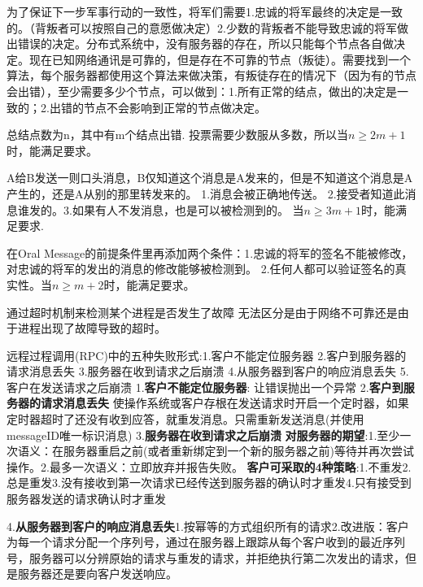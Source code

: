 \documentclass[twoside]{ctexart}
\begin{document}
\begin{multicols}{2}
   为了保证下一步军事行动的一致性，将军们需要1.忠诚的将军最终的决定是一致的。（背叛者可以按照自己的意愿做决定）2.少数的背叛者不能导致忠诚的将军做出错误的决定。分布式系统中，没有服务器的存在，所以只能每个节点各自做决定。现在已知网络通讯是可靠的，但是存在不可靠的节点（叛徒）。需要找到一个算法，每个服务器都使用这个算法来做决策，有叛徒存在的情况下（因为有的节点会出错），至少需要多少个节点，可以做到：1.所有正常的结点，做出的决定是一致的；2.出错的节点不会影响到正常的节点做决定。
  
   总结点数为n，其中有m个结点出错. 投票需要少数服从多数，所以当$n≥2m+1$时，能满足要求。
  
   A给B发送一则口头消息，B仅知道这个消息是A发来的，但是不知道这个消息是A产生的，还是A从别的那里转发来的。  1.消息会被正确地传送。 2.接受者知道此消息谁发的。3.如果有人不发消息，也是可以被检测到的。 当$n≥3m+1$时，能满足要求. 
  
   在Oral Message的前提条件里再添加两个条件：1.忠诚的将军的签名不能被修改，对忠诚的将军的发出的消息的修改能够被检测到。 2.任何人都可以验证签名的真实性。当$n≥m+2$时，能满足要求。
  
    通过超时机制来检测某个进程是否发生了故障  无法区分是由于网络不可靠还是由于进程出现了故障导致的超时。

   远程过程调用(RPC)中的五种失败形式:1.客户不能定位服务器 2.客户到服务器的请求消息丢失 3.服务器在收到请求之后崩溃 4.从服务器到客户的响应消息丢失 5.客户在发送请求之后崩溃    1.\textbf{客户不能定位服务器}: 让错误抛出一个异常 2.\textbf{客户到服务器的请求消息丢失} 使操作系统或客户存根在发送请求时开启一个定时器，如果定时器超时了还没有收到应答，就重发消息。只需重新发送消息(并使用messageID唯一标识消息)  3.\textbf{服务器在收到请求之后崩溃} \textbf{对服务器的期望}:1.至少一次语义：在服务器重启之前(或者重新绑定到一个新的服务器之前)等待并再次尝试操作。2.最多一次语义：立即放弃并报告失败。 \textbf{客户可采取的4种策略}:1.不重发2.总是重发3.没有接收到第一次请求已经传送到服务器的确认时才重发4.只有接受到服务器发送的请求确认时才重发  
  
  4.\textbf{从服务器到客户的响应消息丢失}1.按幂等的方式组织所有的请求2.改进版：客户为每一个请求分配一个序列号，通过在服务器上跟踪从每个客户收到的最近序列号，服务器可以分辨原始的请求与重发的请求，并拒绝执行第二次发出的请求，但是服务器还是要向客户发送响应。
  

\end{multicols}
\end{document}
